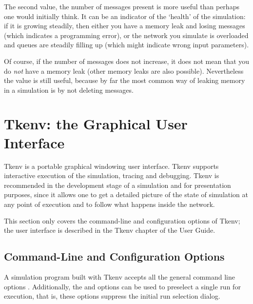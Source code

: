 The second value, the number of messages present is more useful than
perhaps one would initially think. It can be an indicator of the `health' of the simulation:
if it is growing steadily, then either you have a memory leak and losing
messages (which indicates a programming error), or the network you simulate is
overloaded and queues are steadily filling up (which might indicate wrong input
parameters).

Of course, if the number of messages does not increase, it does not mean
that you do \textit{not} have a memory leak (other memory leaks are also
possible). Nevertheless the value is still useful, because by far the
most common way of leaking memory in a simulation is by not deleting messages.



\section{Tkenv: the Graphical User Interface}

Tkenv is a portable graphical windowing user interface.
Tkenv supports interactive execution of the simulation, tracing and
debugging. Tkenv is recommended in the
development stage of a simulation and for presentation purposes,
since it allows one to get a detailed picture of the state
of simulation at any point of execution and to follow what happens
inside the network.

\begin{note}
  This section only covers the command-line and configuration options
  of Tkenv; the user interface is described in the Tkenv chapter of the
  {\opp} User Guide.
\end{note}

\subsection{Command-Line and Configuration Options}

A simulation program built with Tkenv accepts all the general command line
options . Additionally, the 
and  options can be used to preselect a single run for execution,
that is, these options suppress the initial run selection dialog.

